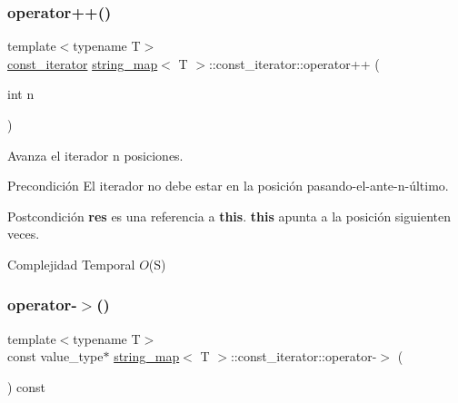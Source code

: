 \subsubsection{\texorpdfstring{operator++()}{operator++()}\hspace{0.1cm}{\footnotesize\ttfamily [2/2]}}
{\footnotesize\ttfamily template$<$typename T$>$ \\
\mbox{\hyperlink{classstring__map_1_1const__iterator}{const\+\_\+iterator}} \mbox{\hyperlink{classstring__map}{string\+\_\+map}}$<$ T $>$\+::const\+\_\+iterator\+::operator++ (\begin{DoxyParamCaption}\item[{int}]{n }\end{DoxyParamCaption})\hspace{0.3cm}{\ttfamily [inline]}}



Avanza el iterador n posiciones. 

\begin{DoxyPrecond}{Precondición}
El iterador no debe estar en la posición pasando-\/el-\/ante-\/n-\/último. 
\end{DoxyPrecond}
\begin{DoxyPostcond}{Postcondición}
{\bfseries res} es una referencia a {\bfseries this}. {\bfseries this} apunta a la posición siguienten veces.
\end{DoxyPostcond}

\begin{DoxyDescription}
\item[Complejidad Temporal]$O$(S)
\end{DoxyDescription}\mbox{\label{classstring__map_1_1const__iterator_acc35ff68cf856fc4cdaacf5b41c37714}} 
\subsubsection{\texorpdfstring{operator-\/$>$()}{operator->()}}
{\footnotesize\ttfamily template$<$typename T$>$ \\
const value\+\_\+type$\ast$ \mbox{\hyperlink{classstring__map}{string\+\_\+map}}$<$ T $>$\+::const\+\_\+iterator\+::operator-\/$>$ (\begin{DoxyParamCaption}{ }\end{DoxyParamCaption}) const\hspace{0.3cm}{\ttfamily [inline]}}



